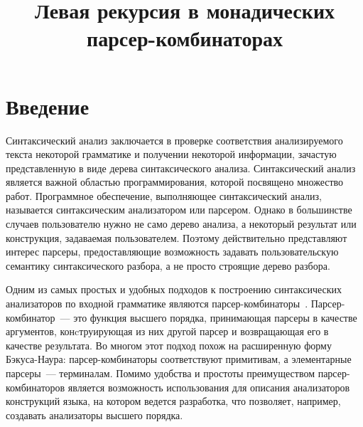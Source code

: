 \documentclass[conference]{IEEEtran}
\begin{document}
\title{Левая рекурсия в монадических парсер-комбинаторах}

\author{
}

\maketitle

\begin{abstract}



\end{abstract}

\begin{IEEEkeywords}



\end{IEEEkeywords}

\section{Введение}

Синтаксический анализ заключается в проверке соответствия анализируемого текста некоторой грамматике и получении некоторой информации, зачастую представленную в виде дерева синтаксического анализа. Синтаксический анализ является важной областью программирования, которой посвящено множество работ. Программное обеспечение, выполняющее синтаксический анализ, называется синтаксическим анализатором или парсером. Однако в большинстве случаев пользователю нужно не само дерево анализа, а некоторый результат или конструкция, задаваемая пользователем. Поэтому действительно представляют интерес парсеры, предоставляющие возможность задавать пользовательскую семантику синтаксического разбора, а не просто строящие дерево разбора.

Одним из самых простых и удобных подходов к построению синтаксических анализаторов по входной грамматике являются парсер-комбинаторы~\cite{meijer}. Парсер-комбинатор~--- это функция высшего порядка, принимающая парсеры в качестве аргументов, конcтруирующая из них другой парсер и возвращающая его в качестве результата. Во многом этот подход похож на расширенную форму Бэкуса-Наура: парсер-комбинаторы соответствуют примитивам, а элементарные парсеры~--- терминалам. Помимо удобства и простоты преимуществом парсер-комбинаторов является возможность использования для описания анализаторов конструкций языка, на котором ведется разработка, что позволяет, например, создавать анализаторы высшего порядка.
\end{document}
